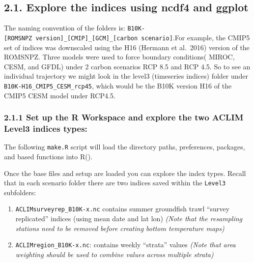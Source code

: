 \documentclass[
]{article}
\newenvironment{Shaded}{\begin{snugshade}}{\end{snugshade}}
\newcommand{\CommentTok}[1]{\textcolor[rgb]{0.56,0.35,0.01}{\textit{#1}}}
\newcommand{\KeywordTok}[1]{\textcolor[rgb]{0.13,0.29,0.53}{\textbf{#1}}}
\newcommand{\NormalTok}[1]{#1}
\newcommand{\StringTok}[1]{\textcolor[rgb]{0.31,0.60,0.02}{#1}}
\providecommand{\tightlist}{%
  \setlength{\itemsep}{0pt}\setlength{\parskip}{0pt}}
\begin{document}
\hypertarget{explore-the-indices-using-ncdf4-and-ggplot}{%
\subsection{2.1. Explore the indices using ncdf4 and
ggplot}\label{explore-the-indices-using-ncdf4-and-ggplot}}

The naming convention of the folders is:
\texttt{B10K-{[}ROMSNPZ\ version{]}\_{[}CMIP{]}\_{[}GCM{]}\_{[}carbon\ scenario{]}}.For
example, the CMIP5 set of indices was downscaled using the H16 (Hermann
et al.~2016) version of the ROMSNPZ. Three models were used to force
boundary conditions( MIROC, CESM, and GFDL) under 2 carbon scenarios RCP
8.5 and RCP 4.5. So to see an individual trajectory we might look in the
level3 (timeseries indices) folder under
\texttt{B10K-H16\_CMIP5\_CESM\_rcp45}, which would be the B10K version
H16 of the CMIP5 CESM model under RCP4.5.

\hypertarget{set-up-the-r-workspace-and-explore-the-two-aclim-level3-indices-types}{%
\subsubsection{2.1.1 Set up the R Workspace and explore the two ACLIM
Level3 indices
types:}\label{set-up-the-r-workspace-and-explore-the-two-aclim-level3-indices-types}}

The following \texttt{make.R} script will load the directory paths,
preferences, packages, and based functions into R().

\begin{Shaded}
\end{Shaded}

Once the base files and setup are loaded you can explore the index
types. Recall that in each scenario folder there are two indices saved
within the \texttt{Level3} subfolders:

\begin{enumerate}
\def\labelenumi{\arabic{enumi})}
\tightlist
\item
  \texttt{ACLIMsurveyrep\_B10K-x.nc} contains summer groundfish trawl
  ``survey replicated'' indices (using mean date and lat lon)
  \emph{(Note that the resampling stations need to be removed before
  creating bottom temperature maps)}\\
\item
  \texttt{ACLIMregion\_B10K-x.nc}: contains weekly ``strata'' values
  \emph{(Note that area weighting should be used to combine values
  across multiple strata)}
\end{enumerate}
\end{document}
